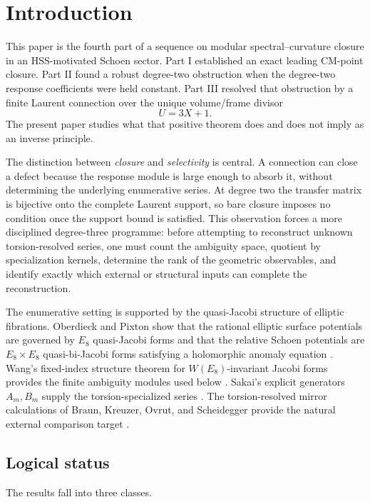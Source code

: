 \documentclass[11pt]{article}
\theoremstyle{definition}
\theoremstyle{remark}
\begin{document}
\section{Introduction}

This paper is the fourth part of a sequence on modular spectral--curvature closure in an HSS-motivated Schoen sector.  Part I established an exact leading CM-point closure.  Part II found a robust degree-two obstruction when the degree-two response coefficients were held constant.  Part III resolved that obstruction by a finite Laurent connection over the unique volume/frame divisor
\[
U=3X+1.
\]
The present paper studies what that positive theorem does and does not imply as an inverse principle.

The distinction between \emph{closure} and \emph{selectivity} is central.  A connection can close a defect because the response module is large enough to absorb it, without determining the underlying enumerative series.  At degree two the transfer matrix is bijective onto the complete Laurent support, so bare closure imposes no condition once the support bound is satisfied.  This observation forces a more disciplined degree-three programme: before attempting to reconstruct unknown torsion-resolved series, one must count the ambiguity space, quotient by specialization kernels, determine the rank of the geometric observables, and identify exactly which external or structural inputs can complete the reconstruction.

The enumerative setting is supported by the quasi-Jacobi structure of elliptic fibrations.  Oberdieck and Pixton show that the rational elliptic surface potentials are governed by $E_8$ quasi-Jacobi forms and that the relative Schoen potentials are $E_8\times E_8$ quasi-bi-Jacobi forms satisfying a holomorphic anomaly equation \cite{OberdieckPixton}.  Wang's fixed-index structure theorem for $W(E_8)$-invariant Jacobi forms provides the finite ambiguity modules used below \cite{Wang}.  Sakai's explicit generators $A_m,B_m$ supply the torsion-specialized series \cite{Sakai}.  The torsion-resolved mirror calculations of Braun, Kreuzer, Ovrut, and Scheidegger provide the natural external comparison target \cite{BKOSA,BKOSB}.

\subsection*{Logical status}

The results fall into three classes.
\end{document}
